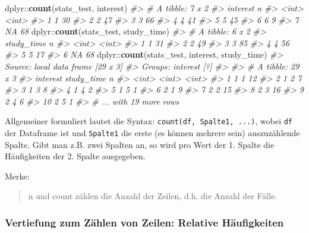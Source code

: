 \documentclass[12pt,ngerman,]{book}
\makeatletter
\newenvironment{Shaded}{\begin{snugshade}}{\end{snugshade}}
\newcommand{\KeywordTok}[1]{\textcolor[rgb]{0.13,0.29,0.53}{\textbf{{#1}}}}
\newcommand{\CommentTok}[1]{\textcolor[rgb]{0.56,0.35,0.01}{\textit{{#1}}}}
\newcommand{\NormalTok}[1]{{#1}}
\newenvironment{kframe}{%
\medskip{}
\setlength{\fboxsep}{.8em}
 \def\at@end@of@kframe{}%
 \ifinner\ifhmode%
  \def\at@end@of@kframe{\end{minipage}}%
  \begin{minipage}{\columnwidth}%
 \fi\fi%
 \def\FrameCommand##1{\hskip\@totalleftmargin \hskip-\fboxsep
 \colorbox{shadecolor}{##1}\hskip-\fboxsep
     \hskip-\linewidth \hskip-\@totalleftmargin \hskip\columnwidth}%
 \MakeFramed {\advance\hsize-\width
   \@totalleftmargin\z@ \linewidth\hsize
   \@setminipage}}%
 {\par\unskip\endMakeFramed%
 \at@end@of@kframe}
\renewenvironment{Shaded}{\begin{kframe}}{\end{kframe}}
\makeatother
\begin{document}
\begin{Shaded}
\begin{Highlighting}[]
\NormalTok{dplyr::}\KeywordTok{count}\NormalTok{(stats_test, interest)}
\CommentTok{#> # A tibble: 7 x 2}
\CommentTok{#>   interest     n}
\CommentTok{#>      <int> <int>}
\CommentTok{#> 1        1    30}
\CommentTok{#> 2        2    47}
\CommentTok{#> 3        3    66}
\CommentTok{#> 4        4    41}
\CommentTok{#> 5        5    45}
\CommentTok{#> 6        6     9}
\CommentTok{#> 7       NA    68}
\NormalTok{dplyr::}\KeywordTok{count}\NormalTok{(stats_test, study_time)}
\CommentTok{#> # A tibble: 6 x 2}
\CommentTok{#>   study_time     n}
\CommentTok{#>        <int> <int>}
\CommentTok{#> 1          1    31}
\CommentTok{#> 2          2    49}
\CommentTok{#> 3          3    85}
\CommentTok{#> 4          4    56}
\CommentTok{#> 5          5    17}
\CommentTok{#> 6         NA    68}
\NormalTok{dplyr::}\KeywordTok{count}\NormalTok{(stats_test, interest, study_time)}
\CommentTok{#> Source: local data frame [29 x 3]}
\CommentTok{#> Groups: interest [?]}
\CommentTok{#> }
\CommentTok{#> # A tibble: 29 x 3}
\CommentTok{#>    interest study_time     n}
\CommentTok{#>       <int>      <int> <int>}
\CommentTok{#>  1        1          1    12}
\CommentTok{#>  2        1          2     7}
\CommentTok{#>  3        1          3     8}
\CommentTok{#>  4        1          4     2}
\CommentTok{#>  5        1          5     1}
\CommentTok{#>  6        2          1     9}
\CommentTok{#>  7        2          2    15}
\CommentTok{#>  8        2          3    16}
\CommentTok{#>  9        2          4     6}
\CommentTok{#> 10        2          5     1}
\CommentTok{#> # ... with 19 more rows}
\end{Highlighting}
\end{Shaded}

Allgemeiner formuliert lautet die Syntax:
\texttt{count(df,\ Spalte1,\ ...)}, wobei \texttt{df} der Dataframe ist
und \texttt{Spalte1} die erste (es können mehrere sein) auszuzählende
Spalte. Gibt man z.B. zwei Spalten an, so wird pro Wert der 1. Spalte
die Häufigkeiten der 2. Spalte ausgegeben.

Merke:

\begin{quote}
n und count zählen die Anzahl der Zeilen, d.h. die Anzahl der Fälle.
\end{quote}

\subsubsection{Vertiefung zum Zählen von Zeilen: Relative
Häufigkeiten}\label{vertiefung-zum-zahlen-von-zeilen-relative-haufigkeiten}
\end{document}
